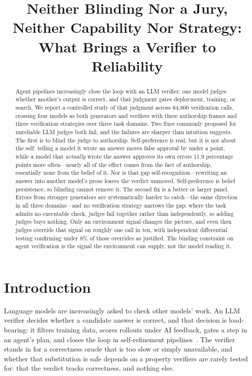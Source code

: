 \documentclass{article}
\title{Neither Blinding Nor a Jury, Neither Capability Nor Strategy: What Brings a Verifier to Reliability}
\begin{document}
\maketitle


\begin{abstract}
  Agent pipelines increasingly close the loop with an LLM verifier: one model judges
  whether another's output is correct, and that judgment gates deployment, training, or
  search. We report a controlled study of that judgment across 64{,}800 verification
  calls, crossing four models as both generators and verifiers with three authorship
  frames and three verification strategies over three task domains. Two fixes commonly
  proposed for unreliable LLM judges both fail, and the failures are sharper than
  intuition suggests. The first is to blind the judge to authorship. Self-preference is
  real, but it is not about the self: telling a model it wrote an answer moves false
  approval by under a point, while a model that \emph{actually} wrote the answer
  approves its own errors 11.9 percentage points more often---nearly all of the effect
  comes from the fact of authorship, essentially none from the belief of it. Nor is
  that gap self-recognition---rewriting an answer into another model's prose leaves the
  verdict unmoved. Self-preference is belief persistence, so blinding cannot remove it.
  The second fix is a better or larger panel. Errors from stronger generators are
  systematically harder to catch---the same direction in all three domains---and no
  verification strategy narrows the gap; where the task admits no executable check,
  judges fail together rather than independently, so adding judges buys nothing. Only
  an environment signal changes the picture, and even then judges override that signal
  on roughly one call in ten, with independent differential testing confirming under
  8\% of those overrides as justified. The binding constraint on agent
  verification is the signal the environment can supply, not the model reading it.
\end{abstract}

\section{Introduction}
\label{sec:intro}

Language models are increasingly asked to check other models' work. An LLM verifier
decides whether a candidate answer is correct, and that decision is load-bearing: it
filters training data, scores rollouts under AI feedback, gates a step in an agent's plan,
and closes the loop in self-refinement
pipelines~\citep{zheng2023judging,bai2022constitutional,madaan2023selfrefine}. The
verifier stands in for a correctness oracle that is too slow or simply unavailable, and
whether that substitution is safe depends on a property verifiers are rarely tested for:
that the verdict tracks correctness, and nothing else.
\end{document}
